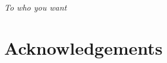 \chapter*{}
\vspace{-2cm} \hspace{13cm} \textit{To who you want}

\clearpage
\chapter*{Acknowledgements}

\lipsum[1-5]
